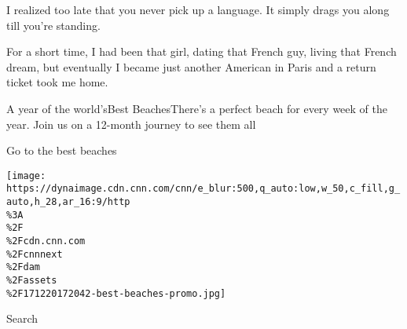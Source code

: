 I realized too late that you never pick up a language. It simply drags
you along till you're standing.

For a short time, I had been that girl, dating that French guy, living
that French dream, but eventually I became just another American in
Paris and a return ticket took me home.

\href{//www.cnn.com/interactive/travel/best-beaches}{}

A year of the world'sBest BeachesThere's a perfect beach for every week
of the year. Join us on a 12-month journey to see them all

Go to the best beaches

\texttt{[image: https://dynaimage.cdn.cnn.com/cnn/e\_blur:500,q\_auto:low,w\_50,c\_fill,g\_auto,h\_28,ar\_16:9/http\\\%3A\\\%2F\\\%2Fcdn.cnn.com\\\%2Fcnnnext\\\%2Fdam\\\%2Fassets\\\%2F171220172042-best-beaches-promo.jpg]}

Search

